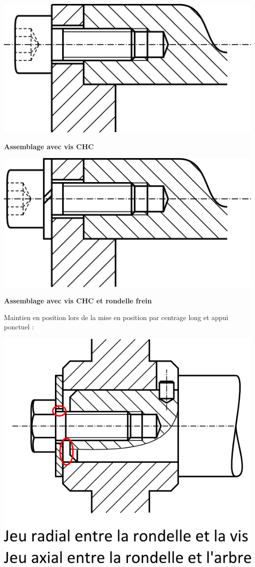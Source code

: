 \documentclass[11pt,oneside]{article}
\begin{document}
\vspace{.5cm}

\noindent\hspace{.15\textwidth}\begin{minipage}[c]{.3\linewidth}
\begin{center}
\includegraphics[width=.9\textwidth]{png/Fig30_4}

\textbf{Assemblage avec vis CHC}
\end{center}
\end{minipage}\hfill
\begin{minipage}[c]{.3\linewidth}
\begin{center}
\includegraphics[width=.9\textwidth]{png/Fig30_5}

\textbf{Assemblage avec vis CHC et rondelle frein}
\end{center}
\end{minipage}\hspace{.15\textwidth}


\vspace{.5cm}

Maintien en position lors de la mise en position par centrage long et appui ponctuel :
\begin{center}
\includegraphics[width=.4\textwidth]{png/Fig31}

\end{center}
\end{document}
